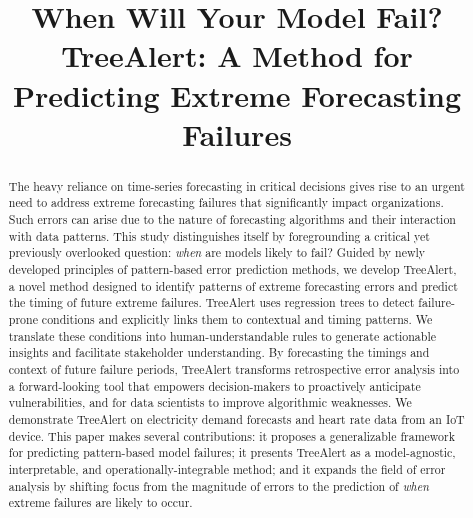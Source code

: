 \documentclass[preprint,12pt]{elsarticle}
\begin{document}



\title{When Will Your Model Fail?\\TreeAlert: A Method for Predicting Extreme Forecasting Failures}



\begin{abstract}
The heavy reliance on time-series forecasting in critical decisions gives rise to an urgent need to address extreme forecasting failures that significantly impact organizations. Such errors can arise due to the nature of forecasting algorithms and their interaction with data patterns. This study distinguishes itself by foregrounding a critical yet previously overlooked question: \textit{when} are models likely to fail? Guided by newly developed principles of pattern-based error prediction methods, we develop TreeAlert, a novel method designed to identify patterns of extreme forecasting errors and predict the timing of future extreme failures. TreeAlert uses regression trees to detect failure-prone conditions and explicitly links them to contextual and timing patterns. We translate these conditions into human-understandable rules to generate actionable insights and facilitate stakeholder understanding. By forecasting the timings and context of future failure periods, TreeAlert transforms retrospective error analysis into a forward-looking tool that empowers decision-makers to proactively anticipate vulnerabilities, and for data scientists to improve algorithmic weaknesses. We demonstrate TreeAlert on electricity demand forecasts and heart rate data from an IoT device. This paper makes several contributions: it proposes a generalizable framework for predicting pattern-based model failures; it presents TreeAlert as a model-agnostic, interpretable, and operationally-integrable method; and it expands the field of error analysis by shifting focus from the magnitude of errors to the prediction of \textit{when} extreme failures are likely to occur.
\end{abstract}
\end{document}
